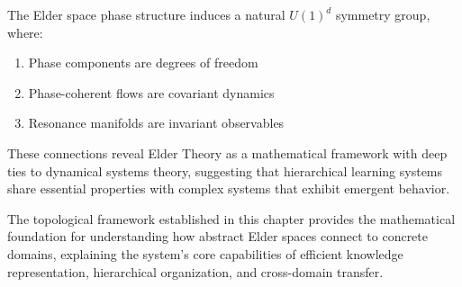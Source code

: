 \begin{theorem}
The Elder space phase structure induces a natural $U(1)^d$ symmetry group, where:
\begin{enumerate}
    \item Phase components are degrees of freedom
    \item Phase-coherent flows are covariant dynamics
    \item Resonance manifolds are invariant observables
\end{enumerate}
\end{theorem}

These connections reveal Elder Theory as a mathematical framework with deep ties to dynamical systems theory, suggesting that hierarchical learning systems share essential properties with complex systems that exhibit emergent behavior.

The topological framework established in this chapter provides the mathematical foundation for understanding how abstract Elder spaces connect to concrete domains, explaining the system's core capabilities of efficient knowledge representation, hierarchical organization, and cross-domain transfer.
